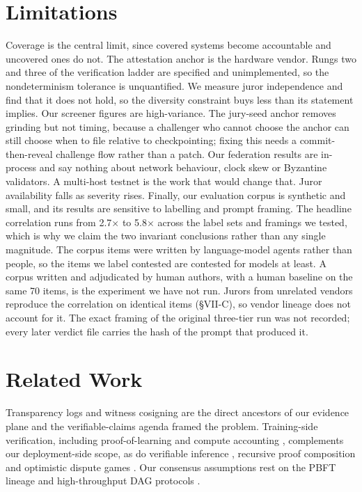 \documentclass[conference]{IEEEtran}
\begin{document}
\section{Limitations}

Coverage is the central limit, since covered systems become accountable and uncovered ones do not. The attestation anchor is the hardware vendor. Rungs two and three of the verification ladder are specified and unimplemented, so the nondeterminism tolerance is unquantified. We measure juror independence and find that it does not hold, so the diversity constraint buys less than its statement implies. Our screener figures are high-variance. The jury-seed anchor removes grinding but not timing, because a challenger who cannot choose the anchor can still choose when to file relative to checkpointing; fixing this needs a commit-then-reveal challenge flow rather than a patch. Our federation results are in-process and say nothing about network behaviour, clock skew or Byzantine validators. A multi-host testnet is the work that would change that. Juror availability falls as severity rises. Finally, our evaluation corpus is synthetic and small, and its results are sensitive to labelling and prompt framing. The headline correlation runs from 2.7$\times$ to 5.8$\times$ across the label sets and framings we tested, which is why we claim the two invariant conclusions rather than any single magnitude. The corpus items were written by language-model agents rather than people, so the items we label contested are contested for models at least. A corpus written and adjudicated by human authors, with a human baseline on the same 70 items, is the experiment we have not run. Jurors from unrelated vendors reproduce the correlation on identical items (\S{}VII-C), so vendor lineage does not account for it. The exact framing of the original three-tier run was not recorded; every later verdict file carries the hash of the prompt that produced it.

\section{Related Work}

Transparency logs and witness cosigning \cite{r1,r21} are the direct ancestors of our evidence plane and the verifiable-claims agenda \cite{r2} framed the problem. Training-side verification, including proof-of-learning \cite{r3} and compute accounting \cite{r4}, complements our deployment-side scope, as do verifiable inference \cite{r5}, recursive proof composition \cite{r29} and optimistic dispute games \cite{r6}. Our consensus assumptions rest on the PBFT lineage \cite{r7,r8,r9} and high-throughput DAG protocols \cite{r22,r23}.
\end{document}
